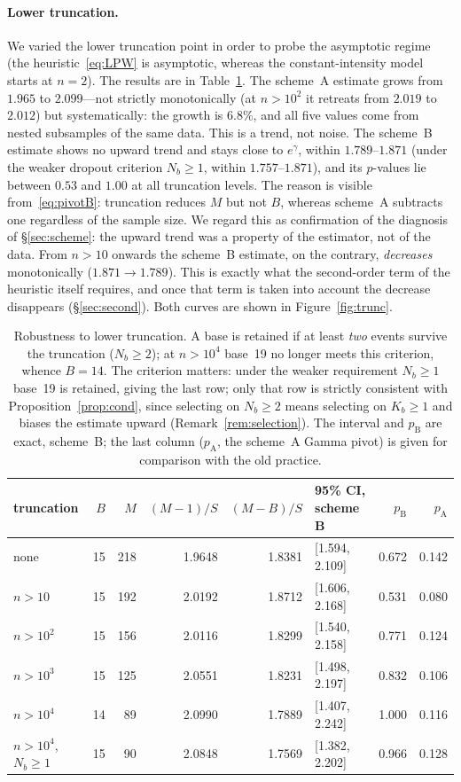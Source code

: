 \documentclass[11pt,a4paper]{article}
\theoremstyle{plain}
\theoremstyle{remark}
\newcommand{\eg}{e^{\gamma}}
\begin{document}
\paragraph{Lower truncation.} We varied the lower truncation point in order to
probe the asymptotic regime (the heuristic~\eqref{eq:LPW} is asymptotic, whereas
the constant-intensity model starts at $n=2$). The results are in
Table~\ref{tab:trunc}. The scheme~A estimate grows from $1.965$ to $2.099$---not
strictly monotonically (at $n>10^{2}$ it retreats from $2.019$ to $2.012$) but
systematically: the growth is $6.8\%$, and all five values come from nested
subsamples of the same data. This is a trend, not noise. The scheme~B estimate
shows no upward trend and stays close to $\eg$, within $1.789$--$1.871$ (under
the weaker dropout criterion $N_b\ge1$, within $1.757$--$1.871$), and its
$p$-values lie between $0.53$ and $1.00$ at all truncation levels. The reason is
visible from~\eqref{eq:pivotB}: truncation reduces $M$ but not $B$, whereas
scheme~A subtracts one regardless of the sample size. We regard this as
confirmation of the diagnosis of \S\ref{sec:scheme}: the upward trend was a
property of the estimator, not of the data. From $n>10$ onwards the scheme~B
estimate, on the contrary, \emph{decreases} monotonically ($1.871\to1.789$). This
is exactly what the second-order term of the heuristic itself requires, and once
that term is taken into account the decrease disappears (\S\ref{sec:second}).
Both curves are shown in Figure~\ref{fig:trunc}.

\begin{table}[t]
\centering
\caption{Robustness to lower truncation. A base is retained if at least
\emph{two} events survive the truncation ($N_b\ge2$); at $n>10^4$ base~19 no longer
meets this criterion, whence $B=14$. The criterion matters: under the weaker
requirement $N_b\ge1$ base~19 is retained, giving the last row; only that row is
strictly consistent with Proposition~\ref{prop:cond}, since selecting on
$N_b\ge2$ means selecting on $K_b\ge1$ and biases the estimate upward
(Remark~\ref{rem:selection}). The interval and $p_{\mathrm B}$ are exact,
scheme~B; the last column ($p_{\mathrm A}$, the scheme~A Gamma pivot) is given
for comparison with the old practice.}
\label{tab:trunc}
\small
\begin{tabular}{lrrrrlrr}
\toprule
truncation & $B$ & $M$ & $(M-1)/S$ & $(M-B)/S$ & 95\% CI, scheme B
& $p_{\mathrm B}$ & $p_{\mathrm A}$\\
\midrule
none & 15 & 218 & 1.9648 & 1.8381 & [1.594, 2.109] & 0.672 & 0.142\\
$n>10$ & 15 & 192 & 2.0192 & 1.8712 & [1.606, 2.168] & 0.531 & 0.080\\
$n>10^2$ & 15 & 156 & 2.0116 & 1.8299 & [1.540, 2.158] & 0.771 & 0.124\\
$n>10^3$ & 15 & 125 & 2.0551 & 1.8231 & [1.498, 2.197] & 0.832 & 0.106\\
$n>10^4$ & 14 & 89 & 2.0990 & 1.7889 & [1.407, 2.242] & 1.000 & 0.116\\
\midrule
$n>10^4$, $N_b\ge1$ & 15 & 90 & 2.0848 & 1.7569 & [1.382, 2.202] & 0.966 & 0.128\\
\bottomrule
\end{tabular}
\end{table}
\end{document}
